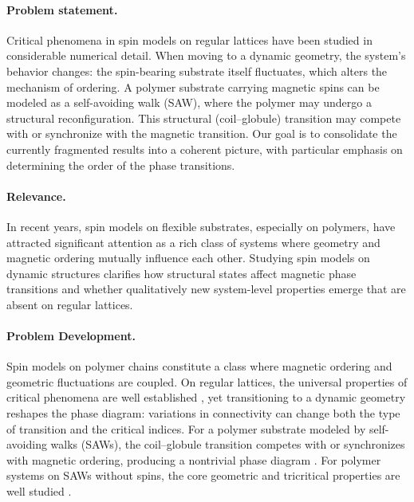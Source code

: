 
\paragraph*{Problem statement.}

Critical phenomena in spin models on regular lattices have been studied in considerable numerical detail. 
 When moving to a dynamic geometry, the system’s behavior changes: the spin-bearing substrate itself fluctuates, which alters the mechanism of ordering. 
 A polymer substrate carrying magnetic spins can be modeled as a self-avoiding walk (SAW), where the polymer may undergo a structural reconfiguration. This structural (coil--globule) transition may compete with or synchronize with the magnetic transition. Our goal is to consolidate the currently fragmented results into a coherent picture, with particular emphasis on determining the order of the phase transitions.


\paragraph*{Relevance.}

In recent years, spin models on flexible substrates, especially on polymers, have attracted significant attention as a rich class of systems where geometry and magnetic ordering mutually influence each other. 
Studying spin models on dynamic structures clarifies how structural states affect magnetic phase transitions and whether qualitatively new system-level properties emerge that are absent on regular lattices.


\paragraph*{Problem Development.}

Spin models on polymer chains constitute a class where magnetic ordering and geometric fluctuations are coupled. On regular lattices, the universal properties of critical phenomena are well established \cite{cardy1996scaling,stanley1971introduction,baxter2013exactly,PELISSETTO2002549,kosterlitz1973ordering,pokrov}, yet transitioning to a dynamic geometry reshapes the phase diagram: variations in connectivity can change both the type of transition and the critical indices. For a polymer substrate modeled by self-avoiding walks (SAWs), the coil--globule transition competes with or synchronizes with magnetic ordering, producing a nontrivial phase diagram \cite{Garel_1999,PhysRevE.104.024122,PhysRevE.108.L042502}. For polymer systems on SAWs without spins, the core geometric and tricritical properties are well studied \cite{Rensburg,Vanderzande_1998,Scaling_concepts}.

